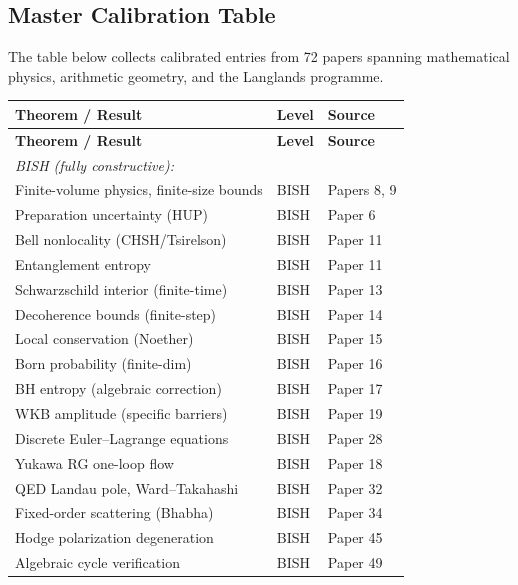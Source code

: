 \documentclass[11pt,a4paper]{article}
\begin{document}
\newpage
\subsection*{Master Calibration Table}

The table below collects calibrated entries from 72 papers spanning mathematical physics, arithmetic geometry, and the Langlands programme.

\begin{center}
\begin{longtable}{@{}p{5.8cm}ll@{}}
\toprule
\textbf{Theorem / Result} & \textbf{Level} & \textbf{Source} \\
\midrule
\endfirsthead
\toprule
\textbf{Theorem / Result} & \textbf{Level} & \textbf{Source} \\
\midrule
\endhead
\multicolumn{3}{l}{\textit{BISH (fully constructive):}} \\
Finite-volume physics, finite-size bounds & BISH & Papers 8, 9 \\
Preparation uncertainty (HUP) & BISH & Paper 6 \\
Bell nonlocality (CHSH/Tsirelson) & BISH & Paper 11 \\
Entanglement entropy & BISH & Paper 11 \\
Schwarzschild interior (finite-time) & BISH & Paper 13 \\
Decoherence bounds (finite-step) & BISH & Paper 14 \\
Local conservation (Noether) & BISH & Paper 15 \\
Born probability (finite-dim) & BISH & Paper 16 \\
BH entropy (algebraic correction) & BISH & Paper 17 \\
WKB amplitude (specific barriers) & BISH & Paper 19 \\
Discrete Euler--Lagrange equations & BISH & Paper 28 \\
Yukawa RG one-loop flow & BISH & Paper 18 \\
QED Landau pole, Ward--Takahashi & BISH & Paper 32 \\
Fixed-order scattering (Bhabha) & BISH & Paper 34 \\
Hodge polarization degeneration & BISH & Paper 45 \\
Algebraic cycle verification & BISH & Paper 49 \\

\end{longtable}
\end{center}
\end{document}
